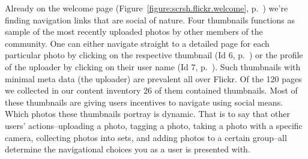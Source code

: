             
Already on the welcome page (Figure~\ref{figure:scrsh.flickr.welcome},
p.~\pageref{figure:scrsh.flickr.welcome})
we're finding navigation links that are social of
nature. Four thumbnails functions as sample of the most recently uploaded
photos by other members of the community. One can either navigate straight to
a detailed page for each particular photo by clicking on the respective
thumbnail (Id 6, p.~\pageref{table:flickr.content.inventory.6})
or the profile of the uploader by clicking on their user
name (Id 7, p.~\pageref{table:flickr.content.inventory.7}). Such thumbnails
with minimal meta data (the uploader) are prevalent all over Flickr. Of the
120 pages we collected in our content inventory 26 of them contained
thumbnails. Most of these thumbnails%
are giving users incentives to navigate using social means.
Which photos these thumbnails portray is dynamic. That is to say that other
users' actions--uploading a photo, tagging a photo, taking a photo with a
specific camera, collecting photos into sets, and adding photos to a certain
group--all determine the navigational choices you as a user is
presented with.

